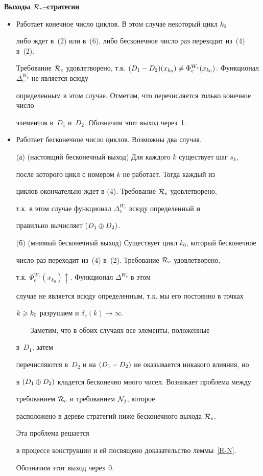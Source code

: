 \underline{\bf Выходы ${\cal R}_e$--стратегии}


\begin{itemize}


\item[1)] Работает конечное число циклов. В этом случае некоторый цикл $k_0$


либо ждет в~(2) или в~(6), либо бесконечное число раз переходит из~(4) в~(2).


Требование $\req{R}{e}$ удовлетворено, т.к. $\draz(x_{k_0})\neq\Phi_e^


{W_e}(x_{k_0})$. Функционал $\Delta_e^{W_e}$ не является всюду 


определенным в этом случае. Отметим, что перечисляется только конечное число


элементов в~$D_1$ и~$D_2$. Обозначим этот выход через~1.


\item[2)] Работает бесконечное число циклов. Возможны два случая.


 


(а) (настоящий бесконечный выход) Для каждого $k$ существует шаг $s_k$,


после которого цикл с номером $k$ не работает. Тогда каждый из


циклов окончательно ждет в (4). Требование ${\cal R}_e$ удовлетворено,


т.к. в этом случае функционал $\Delta_e^{W_e}$ всюду определенный и 


правильно вычисляет $(D_1\oplus D_2)$.





(б) (мнимый бесконечный выход) Существует цикл $k_0$, который бесконечное


число раз переходит из~(4) в~(2). Требование ${\cal R}_e$ удовлетворено, 


т.к. $\Phi_e^{W_e}(x_{k_0})\uparrow$. Функционал $\Delta^{W_e}$ в этом 


случае не является всюду определенным, т.к. мы его постоянно в точках 


$k\geqslant k_0$ разрушаем и $\delta_e(k)\to\infty$.





$\qquad$Заметим, что в обоих случаях все элементы, положенные


в~$D_1$, затем


перечисляются в~$D_2$ и на $(D_1-D_2)$ не оказывается никакого влияния, но


в $(D_1\oplus D_2)$ кладется бесконечно много чисел. Возникает проблема между 


требованием ${\cal R}_e$ и требованием ${\cal N}_j$, которое 


расположено в дереве стратегий ниже бесконечного выхода ${\cal R}_e$. 


Эта проблема решается 


в процессе конструкции и ей посвящено доказательство леммы~\ref{R-N}.


Обозначим этот выход через~0.


\end{itemize}





